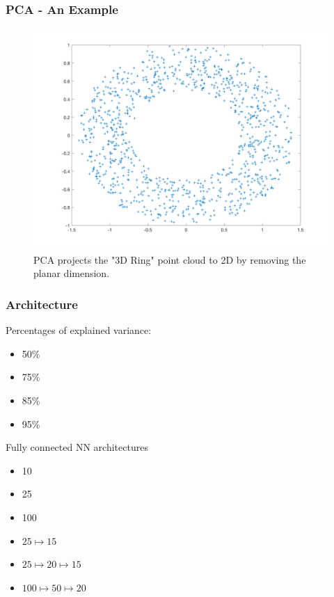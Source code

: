 \documentclass{beamer}
\begin{document}
\begin{frame}
\frametitle{PCA - An Example}
	\begin{figure}[hbt]
\includegraphics[width=1\textwidth,height=0.7\textheight,keepaspectratio]{ring_pca}
  	\caption{\footnotesize{PCA projects the "3D Ring" point cloud to 2D by removing the planar dimension.}}
	\end{figure}
\end{frame}


\begin{frame}
\frametitle{Architecture}
	\vspace{1em}
	Percentages of explained variance: \\
	\begin{itemize}
		\item 50\%
		\item 75\%
		\item 85\%
		\item 95\%
	\end{itemize}
	Fully connected NN architectures\\
	\begin{itemize}
		\item 10
		\item 25
		\item 100
		\item $25 \longmapsto 15$
		\item $25 \longmapsto 20 \longmapsto 15$
		\item $100 \longmapsto 50 \longmapsto 20$
	\end{itemize}
\end{frame}
\end{document}
